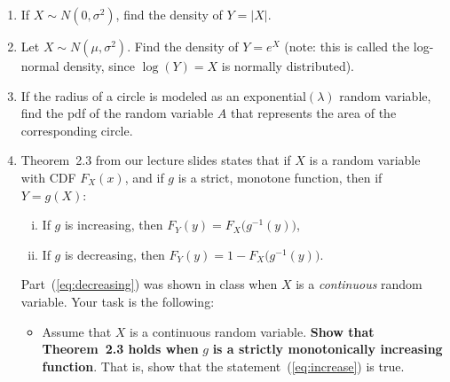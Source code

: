 \documentclass[10pt,twoside]{article}\usepackage[]{graphicx}\usepackage[dvipsnames,svgnames,table]{xcolor}
\begin{document}
\begin{enumerate}
    \item If $X \sim N(0, \sigma^2)$, find the density of $Y = |X|$.
    \item Let $X \sim N(\mu, \sigma^2)$. Find the density of $Y = e^X$ (note: this is called the log-normal density, since $\log (Y) = X$ is normally distributed).
    \item If the radius of a circle is modeled as an exponential$(\lambda)$ random variable, find the pdf of the random variable $A$ that represents the area of the corresponding circle.

    \item Theorem~2.3 from our lecture slides states that if $X$ is a random variable with CDF $F_X(x)$, and if $g$ is a strict, monotone function, then if $Y = g(X)$:
    \begin{enumerate}[(i)]
      \item \label{eq:increase} If $g$ is increasing, then $F_Y(y) = F_X\big(g^{-1}(y)\big)$,
      \item \label{eq:decreasing} If $g$ is decreasing, then $F_Y(y) = 1 - F_X\big(g^{-1}(y)\big)$.
    \end{enumerate}
    Part~(\ref{eq:decreasing}) was shown in class when $X$ is a \emph{continuous} random variable. Your task is the following:
    \begin{itemize}
      \item Assume that $X$ is a continuous random variable. 
      \textbf{Show that Theorem~2.3 holds when} $g$ \textbf{is a strictly monotonically increasing function}. 
      That is, show that the statement~(\ref{eq:increase}) is true.
    \end{itemize}
\end{enumerate}
\end{document}
